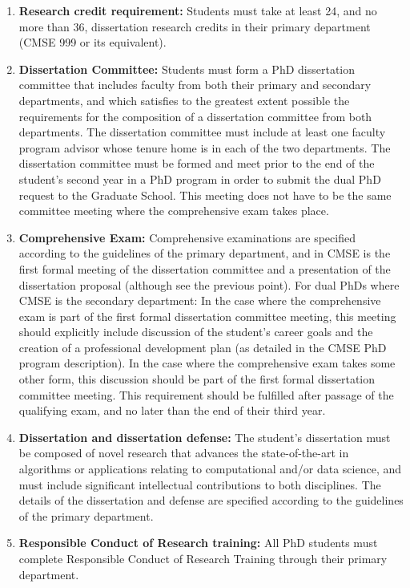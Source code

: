 \begin{enumerate}
\item \textbf{Research credit requirement:}  Students must take at
  least 24, and no more than 36, dissertation research credits in
  their primary department (CMSE 999 or its equivalent).

\item \textbf{Dissertation Committee:} Students must form a PhD dissertation
  committee that includes faculty from both their primary and
  secondary departments, and which satisfies to the greatest extent
  possible the requirements for the composition of a dissertation committee
  from both departments.  The dissertation committee must include at least
  one faculty program advisor whose tenure home is in each of the two
  departments.  The dissertation committee must be formed and meet prior to
  the end of the student's second year in a PhD program in order to
  submit the dual PhD request to the Graduate School.  This meeting
  does not have to be the same committee meeting where the
  comprehensive exam takes place.

\item \textbf{Comprehensive Exam:}  Comprehensive examinations are
  specified according to the guidelines of the primary department, and
  in CMSE is the first formal meeting of the dissertation committee and a
  presentation of the dissertation proposal (although see the previous
  point).  For dual PhDs where CMSE is the secondary department: In
  the case where the comprehensive exam is part of the first formal
  dissertation committee meeting, this meeting should explicitly include
  discussion of the student's career goals and the creation of a
  professional development plan (as detailed in the CMSE PhD program
  description).  In the case where the comprehensive exam takes some
  other form, this discussion should be part of the first formal
  dissertation committee meeting.  This requirement should be fulfilled
  after passage of the qualifying exam, and no later than the end of
  their third year.

\item \textbf{Dissertation and dissertation defense:} The student's
  dissertation must be composed of novel research that advances the
  state-of-the-art in algorithms or applications relating to
  computational and/or data science, and must include significant
  intellectual contributions to both disciplines.  The details of the
  dissertation and defense are specified according to the guidelines
  of the primary department.

\item \textbf{Responsible Conduct of Research training:} All PhD
  students must complete Responsible Conduct of Research Training
  through their primary department.

\end{enumerate}

